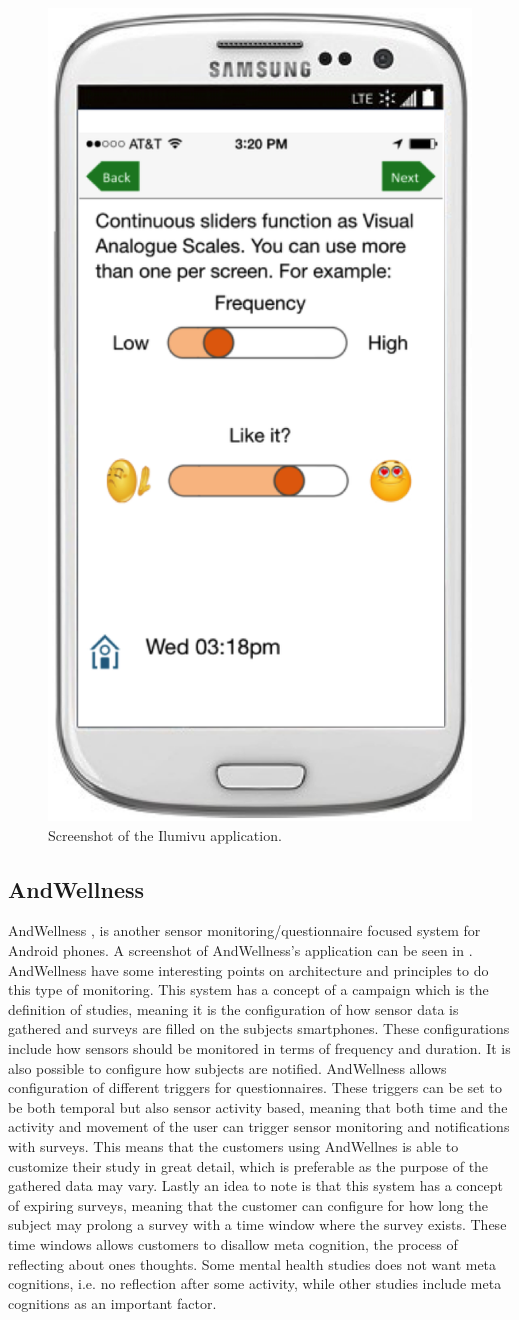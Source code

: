 \begin{figure}[!htbp]
	\centering
	\includegraphics[height=0.5\textwidth]{graphic/existing_solutions/ilumivu.png}
	\caption[]{Screenshot of the Ilumivu application\footnotemark.}
	\label{fig:ilumivu_screenshot}
\end{figure}
\FloatBarrier
{}

\subsection{AndWellness}
\label{sub:andwellness}

AndWellness \parencite{hicks2010andwellness}, is another sensor monitoring/questionnaire focused system for Android phones. A screenshot of AndWellness's application can be seen in . AndWellness have some interesting points on architecture and principles to do this type of monitoring. This system has a concept of a campaign which is the definition of studies, meaning it is the configuration of how sensor data is gathered and surveys are filled on the subjects smartphones. These configurations include how sensors should be monitored in terms of frequency and duration. It is also possible to configure how subjects are notified. AndWellness allows configuration of different triggers for questionnaires. These triggers can be set to be both temporal but also sensor activity based, meaning that both time and the activity and movement of the user can trigger sensor monitoring and notifications with surveys. This means that the customers using AndWellnes is able to customize their study in great detail, which is preferable as the purpose of the gathered data may vary. Lastly an idea to note is that this system has a concept of expiring surveys, meaning that the customer can configure for how long the subject may prolong a survey with a time window where the survey exists. These time windows allows customers to disallow meta cognition, the process of reflecting about ones thoughts. Some mental health studies does not want meta cognitions, i.e. no reflection after some activity, while other studies include meta cognitions as an important factor. 

